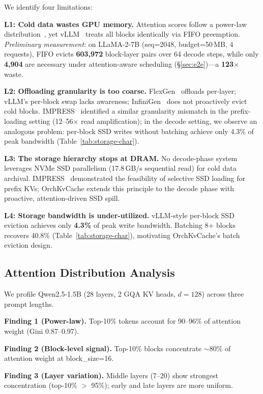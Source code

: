 \documentclass[conference]{IEEEtran}
\begin{document}
We identify four limitations:

\textbf{L1: Cold data wastes GPU memory.} Attention scores follow a power-law distribution~\cite{h2o,scissorhands}, yet vLLM~\cite{vllm} treats all blocks identically via FIFO preemption. \emph{Preliminary measurement}: on LLaMA-2-7B (seq=2048, budget=50\,MB, 4 requests), FIFO evicts \textbf{603{,}972} block-layer pairs over 64 decode steps, while only \textbf{4{,}904} are necessary under attention-aware scheduling (\S\ref{sec:e2e})---a \textbf{123$\times$} waste.

\textbf{L2: Offloading granularity is too coarse.} FlexGen~\cite{flexgen} offloads per-layer; vLLM's per-block swap lacks awareness; InfiniGen~\cite{infinigen} does not proactively evict cold blocks.  IMPRESS~\cite{impress} identified a similar granularity mismatch in the prefix-loading setting (12--56$\times$ read amplification); in the decode setting, we observe an analogous problem: per-block SSD writes without batching achieve only 4.3\% of peak bandwidth (Table~\ref{tab:storage-char}).

\textbf{L3: The storage hierarchy stops at DRAM.} No decode-phase system leverages NVMe SSD parallelism (17.8\,GB/s sequential read) for cold data archival.  IMPRESS~\cite{impress} demonstrated the feasibility of selective SSD loading for prefix KVs; OrchKvCache extends this principle to the decode phase with proactive, attention-driven SSD spill.

\textbf{L4: Storage bandwidth is under-utilized.} vLLM-style per-block SSD eviction achieves only \textbf{4.3\%} of peak write bandwidth. Batching 8+ blocks recovers 40.8\% (Table~\ref{tab:storage-char}), motivating OrchKvCache's batch eviction design.

\subsection{Attention Distribution Analysis}

We profile Qwen2.5-1.5B (28 layers, 2 GQA KV heads, $d{=}128$) across three prompt lengths.


\textbf{Finding 1 (Power-law).} Top-10\% tokens account for 90--96\% of attention weight (Gini 0.87--0.97).

\textbf{Finding 2 (Block-level signal).} Top-10\% blocks concentrate ${\sim}$80\% of attention weight at block\_size=16.

\textbf{Finding 3 (Layer variation).} Middle layers (7--20) show strongest concentration (top-10\% $>$ 95\%); early and late layers are more uniform.
\end{document}
